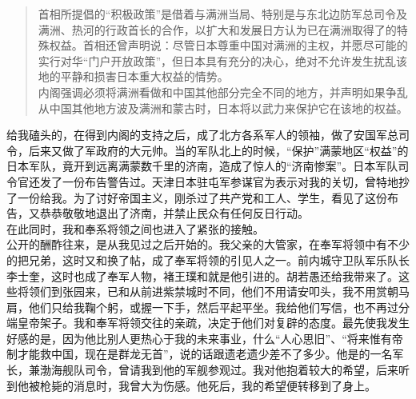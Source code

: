 \begin{quote}
	首相所提倡的“积极政策”是借着与满洲当局、特别是与东北边防军总司令及满洲、热河的行政首长的合作，以扩大和发展日方认为已在满洲取得了的特殊权益。首相还曾声明说：尽管日本尊重中国对满洲的主权，并愿尽可能的实行对华“门户开放政策”，但日本具有充分的决心，绝对不允许发生扰乱该地的平静和损害日本重大权益的情势。\\

内阁强调必须将满洲看做和中国其他部分完全不同的地方，并声明如果争乱从中国其他地方波及满洲和蒙古时，日本将以武力来保护它在该地的权益。\\
\end{quote}

给我磕头的，在得到内阁的支持之后，成了北方各系军人的领袖，做了安国军总司令，后来又做了军政府的大元帅。当的军队北上的时候，“保护”满蒙地区“权益”的日本军队，竟开到远离满蒙数千里的济南，造成了惊人的“济南惨案”。日本军队司令官还发了一份布告警告过。天津日本驻屯军参谋官为表示对我的关切，曾特地抄了一份给我。为了讨好帝国主义，刚杀过了共产党和工人、学生，看见了这份布告，又恭恭敬敬地退出了济南，并禁止民众有任何反日行动。\\

在此同时，我和奉系将领之间也进入了紧张的接触。\\

公开的酬酢往来，是从我见过之后开始的。我父亲的大管家，在奉军将领中有不少的把兄弟，这时又和换了帖，成了奉军将领的引见人之一。前内城守卫队军乐队长李士奎，这时也成了奉军人物，褚王璞和就是他引进的。胡若愚还给我带来了。这些将领们到张园来，已和从前进紫禁城时不同，他们不用请安叩头，我不用赏朝马肩，他们只给我鞠个躬，或握一下手，然后平起平坐。我给他们写信，也不再过分端皇帝架子。我和奉军将领交往的亲疏，决定于他们对复辟的态度。最先使我发生好感的是，因为他比别人更热心于我的未来事业，什么“人心思旧”、“将来惟有帝制才能救中国，现在是群龙无首”，说的话跟遗老遗少差不了多少。他是的一名军长，兼渤海舰队司令，曾请我到他的军舰参观过。我对他抱着较大的希望，后来听到他被枪毙的消息时，我曾大为伤感。他死后，我的希望便转移到了身上。\\

